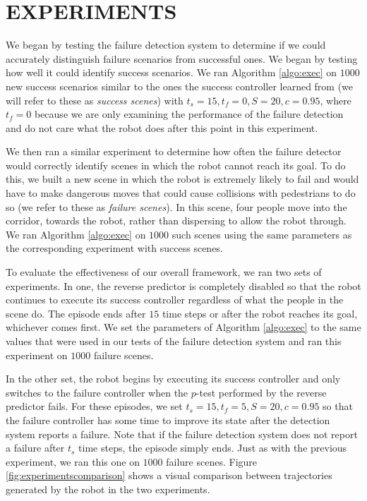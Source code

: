 \documentclass[letterpaper, 10 pt, conference]{ieeeconf}  %
\begin{document}
\section{EXPERIMENTS}\label{sec:experiments}
	We began by testing the failure detection system to determine if we could accurately distinguish failure scenarios from successful ones. We began by testing how well it could identify success scenarios. We ran Algorithm \ref{algo:exec} on $1000$ new success scenarios similar to the ones the success controller learned from (we will refer to these as \textit{success scenes}) with $t_s=15, t_f=0, S=20, c=0.95$, where $t_f=0$ because we are only examining the performance of the failure detection and do not care what the robot does after this point in this experiment. 
	
	We then ran a similar experiment to determine how often the failure detector would correctly identify scenes in which the robot cannot reach its goal. To do this, we built a new scene in which the robot is extremely likely to fail and would have to make dangerous moves that could cause collisions with pedestrians to do so (we refer to these as \textit{failure scenes}). In this scene, four people move into the corridor, towards the robot, rather than dispersing to allow the robot through. We ran Algorithm \ref{algo:exec} on $1000$ such scenes using the same parameters as the corresponding experiment with success scenes.

	To evaluate the effectiveness of our overall framework, we ran two sets of experiments. In one, the reverse predictor is completely disabled so that the robot continues to execute its success controller regardless of what the people in the scene do. The episode ends after $15$ time steps or after the robot reaches its goal, whichever comes first. We set the parameters of Algorithm \ref{algo:exec} to the same values that were used in our tests of the failure detection system and ran this experiment on $1000$ failure scenes.
	
	In the other set, the robot begins by executing its success controller and only switches to the failure controller when the $p$-test performed by the reverse predictor fails. For these episodes, we set $t_s=15, t_f=5, S=20, c=0.95$ so that the failure controller has some time to improve its state after the detection system reports a failure. Note that if the failure detection system does not report a failure after $t_s$ time steps, the episode simply ends. Just as with the previous experiment, we ran this one on $1000$ failure scenes. Figure \ref{fig:experimentscomparison} shows a visual comparison between trajectories generated by the robot in the two experiments.
	
\end{document}

